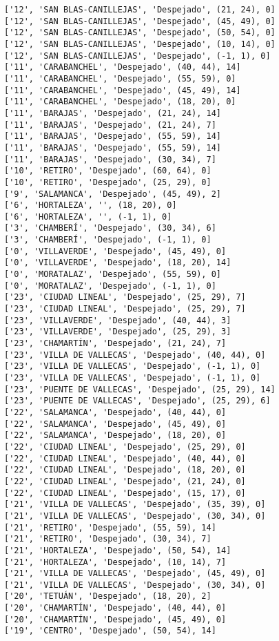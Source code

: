 \documentclass[11pt]{article}
\begin{document}
\begin{Verbatim}[commandchars=\\\{\}]
['12', 'SAN BLAS-CANILLEJAS', 'Despejado', (21, 24), 0]
['12', 'SAN BLAS-CANILLEJAS', 'Despejado', (45, 49), 0]
['12', 'SAN BLAS-CANILLEJAS', 'Despejado', (50, 54), 0]
['12', 'SAN BLAS-CANILLEJAS', 'Despejado', (10, 14), 0]
['12', 'SAN BLAS-CANILLEJAS', 'Despejado', (-1, 1), 0]
['11', 'CARABANCHEL', 'Despejado', (40, 44), 14]
['11', 'CARABANCHEL', 'Despejado', (55, 59), 0]
['11', 'CARABANCHEL', 'Despejado', (45, 49), 14]
['11', 'CARABANCHEL', 'Despejado', (18, 20), 0]
['11', 'BARAJAS', 'Despejado', (21, 24), 14]
['11', 'BARAJAS', 'Despejado', (21, 24), 7]
['11', 'BARAJAS', 'Despejado', (55, 59), 14]
['11', 'BARAJAS', 'Despejado', (55, 59), 14]
['11', 'BARAJAS', 'Despejado', (30, 34), 7]
['10', 'RETIRO', 'Despejado', (60, 64), 0]
['10', 'RETIRO', 'Despejado', (25, 29), 0]
['9', 'SALAMANCA', 'Despejado', (45, 49), 2]
['6', 'HORTALEZA', '', (18, 20), 0]
['6', 'HORTALEZA', '', (-1, 1), 0]
['3', 'CHAMBERÍ', 'Despejado', (30, 34), 6]
['3', 'CHAMBERÍ', 'Despejado', (-1, 1), 0]
['0', 'VILLAVERDE', 'Despejado', (45, 49), 0]
['0', 'VILLAVERDE', 'Despejado', (18, 20), 14]
['0', 'MORATALAZ', 'Despejado', (55, 59), 0]
['0', 'MORATALAZ', 'Despejado', (-1, 1), 0]
['23', 'CIUDAD LINEAL', 'Despejado', (25, 29), 7]
['23', 'CIUDAD LINEAL', 'Despejado', (25, 29), 7]
['23', 'VILLAVERDE', 'Despejado', (40, 44), 3]
['23', 'VILLAVERDE', 'Despejado', (25, 29), 3]
['23', 'CHAMARTÍN', 'Despejado', (21, 24), 7]
['23', 'VILLA DE VALLECAS', 'Despejado', (40, 44), 0]
['23', 'VILLA DE VALLECAS', 'Despejado', (-1, 1), 0]
['23', 'VILLA DE VALLECAS', 'Despejado', (-1, 1), 0]
['23', 'PUENTE DE VALLECAS', 'Despejado', (25, 29), 14]
['23', 'PUENTE DE VALLECAS', 'Despejado', (25, 29), 6]
['22', 'SALAMANCA', 'Despejado', (40, 44), 0]
['22', 'SALAMANCA', 'Despejado', (45, 49), 0]
['22', 'SALAMANCA', 'Despejado', (18, 20), 0]
['22', 'CIUDAD LINEAL', 'Despejado', (25, 29), 0]
['22', 'CIUDAD LINEAL', 'Despejado', (40, 44), 0]
['22', 'CIUDAD LINEAL', 'Despejado', (18, 20), 0]
['22', 'CIUDAD LINEAL', 'Despejado', (21, 24), 0]
['22', 'CIUDAD LINEAL', 'Despejado', (15, 17), 0]
['21', 'VILLA DE VALLECAS', 'Despejado', (35, 39), 0]
['21', 'VILLA DE VALLECAS', 'Despejado', (30, 34), 0]
['21', 'RETIRO', 'Despejado', (55, 59), 14]
['21', 'RETIRO', 'Despejado', (30, 34), 7]
['21', 'HORTALEZA', 'Despejado', (50, 54), 14]
['21', 'HORTALEZA', 'Despejado', (10, 14), 7]
['21', 'VILLA DE VALLECAS', 'Despejado', (45, 49), 0]
['21', 'VILLA DE VALLECAS', 'Despejado', (30, 34), 0]
['20', 'TETUÁN', 'Despejado', (18, 20), 2]
['20', 'CHAMARTÍN', 'Despejado', (40, 44), 0]
['20', 'CHAMARTÍN', 'Despejado', (45, 49), 0]
['19', 'CENTRO', 'Despejado', (50, 54), 14]

\end{Verbatim}
\end{document}
